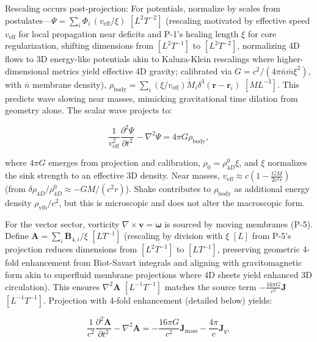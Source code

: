 Rescaling occurs post-projection: For potentials, normalize by scales from postulates---$\Psi = \sum_i \Phi_i \, (v_{\text{eff}} / \xi)$ $[L^2 T^{-2}]$ (rescaling motivated by effective speed $v_{\text{eff}}$ for local propagation near deficits and P-1's healing length $\xi$ for core regularization, shifting dimensions from $[L^2 T^{-1}]$ to $[L^2 T^{-2}]$, normalizing 4D flows to 3D energy-like potentials akin to Kaluza-Klein rescalings where higher-dimensional metrics yield effective 4D gravity; calibrated via $G = c^2 / (4\pi \bar{n} \bar{m} \xi^2)$, with $\bar{n}$ membrane density), $\rho_{\text{body}} = \sum_i \left( \xi / v_{\text{eff}} \right) \dot{M}_i \delta^3(\mathbf{r} - \mathbf{r}_i)$ $[M L^{-3}]$. This predicts wave slowing near masses, mimicking gravitational time dilation from geometry alone. The scalar wave projects to:

\begin{equation}
\frac{1}{v_{\text{eff}}^2} \frac{\partial^2 \Psi}{\partial t^2} - \nabla^2 \Psi = 4\pi G \rho_{\text{body}},
\end{equation}

where $4\pi G$ emerges from projection and calibration, $\rho_0 = \rho_{4D}^0 \xi$, and $\xi$ normalizes the sink strength to an effective 3D density. Near masses, $v_{\text{eff}} \approx c \left(1 - \frac{G M}{2 c^2 r}\right)$ (from $\delta \rho_{4D} / \rho_{4D}^0 \approx - G M / (c^2 r)$). Shake contributes to $\rho_{\text{body}}$ as additional energy density $\rho_{\text{vib}} / c^2$, but this is microscopic and does not alter the macroscopic form.

For the vector sector, vorticity $\nabla \times \mathbf{v} = \boldsymbol{\omega}$ is sourced by moving membranes (P-5). Define $\mathbf{A} = \sum_i \mathbf{B}_{4,i} / \xi$ $[L T^{-1}]$ (rescaling by division with $\xi$ $[L]$ from P-5's projection reduces dimensions from $[L^2 T^{-1}]$ to $[L T^{-1}]$, preserving geometric 4-fold enhancement from Biot-Savart integrals and aligning with gravitomagnetic form akin to superfluid membrane projections where 4D sheets yield enhanced 3D circulation). This ensures $\nabla^2 \mathbf{A}$ $[L^{-1} T^{-1}]$ matches the source term $-\frac{16\pi G}{c^2} \mathbf{J}$ $[L^{-1} T^{-1}]$. Projection with 4-fold enhancement (detailed below) yields:

\begin{equation}
\frac{1}{c^2} \frac{\partial^2 \mathbf{A}}{\partial t^2} - \nabla^2 \mathbf{A} = -\frac{16\pi G}{c^2} \mathbf{J}_{\text{mass}} - \frac{4\pi}{c} \mathbf{J}_q,
\end{equation}

